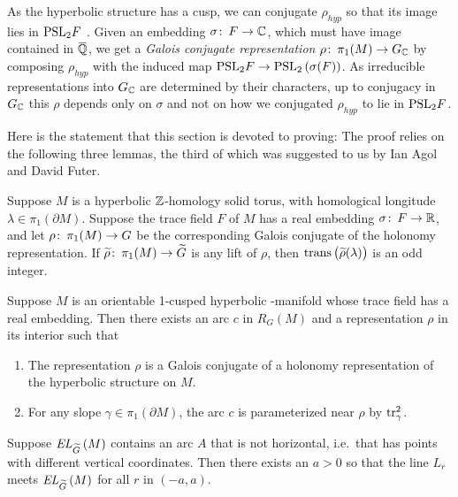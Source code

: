 \documentclass[tikz, sepfignums, defaultenums]{nmd/article}
\newcommand{\G}{G}
\newcommand{\RG}[1]{\mathit{R}_{G}\left(#1\right)}
\newcommand{\GC}{G_\C}
\DeclareMathOperator{\trans}{trans}
\newcommand{\TEL}[1]{\mathit{EL}_\Gtil\left(#1\right)}
\newcommand{\rhohyp}{\rho_{\mathit{hyp}}}
\begin{document}
As the hyperbolic structure has a cusp, we can conjugate $\rhohyp$ so
that its image lies in $\mathrm{PSL}_{2} F$
\cite[Theorem~3.3.8]{MaclachlanReid2003}.  Given an embedding
$\sigma \colon\thinspace F \to {\mathbb C}$, which must have image contained in $\QQbar$,
we get a \emph{Galois conjugate representation}
$\rho \maps \pi_1(M) \to \GC$ by composing $\rhohyp$ with the induced
map $\mathrm{PSL}_{2} F \to \mathrm{PSL}_{2} \left(\sigma(F)\right)$.  As irreducible
representations into $\GC$ are determined by their characters, up to
conjugacy in $\GC$ this $\rho$ depends only on $\sigma$ and not on how
we conjugated $\rhohyp$ to lie in $\mathrm{PSL}_{2} F$.

Here is the statement that this section is devoted to proving:
\maintheoremtwo*
\noindent
The proof relies on the following three lemmas, the third of which was
suggested to us by Ian Agol and David Futer. 

\begin{lemma}\label{lem:transodd}
  Suppose $M$ is a hyperbolic ${\mathbb Z}$-homology solid torus, with
  homological longitude $\lambda \in \pi_1(\partial M)$.  Suppose
  the trace field $F$ of $M$ has a real embedding
  $\sigma \colon\thinspace F \to {\mathbb R}$, and let $\rho \maps \pi_1(M) \to \G$ be the
  corresponding Galois conjugate of the holonomy representation.  If
  $\rhotil \maps \pi_1(M) \to \Gtil$ is any lift of $\rho$, then
  $\trans\big(\rhotil(\lambda)\big)$ is an odd integer.
\end{lemma}

\begin{lemma}\label{lem:galois}
  Suppose $M$ is an orientable 1-cusped hyperbolic \3-manifold whose
  trace field has a real embedding.  Then there exists an arc $c$ in
  $\RG{M}$ and a representation $\rho$ in its interior such
  that
  \begin{enumerate}
    \item The representation $\rho$ is a Galois conjugate of
      a holonomy representation of the hyperbolic structure on $M$.  
    \item For any slope $\gamma \in \pi_1(\partial M)$, the arc $c$ is
      parameterized near $\rho$ by $\operatorname{tr}^2_\gamma$.
  \end{enumerate}
\end{lemma}

\begin{lemma}\label{lem:iandave}
  Suppose $\TEL{M}$ contains an arc $A$ that is not horizontal,
  i.e.~that has points with different vertical coordinates.  Then
  there exists an $a > 0$ so that the line $L_r$ meets $\TEL{M}$ for
  all $r$ in $(-a, a)$.
\end{lemma}
\end{document}
